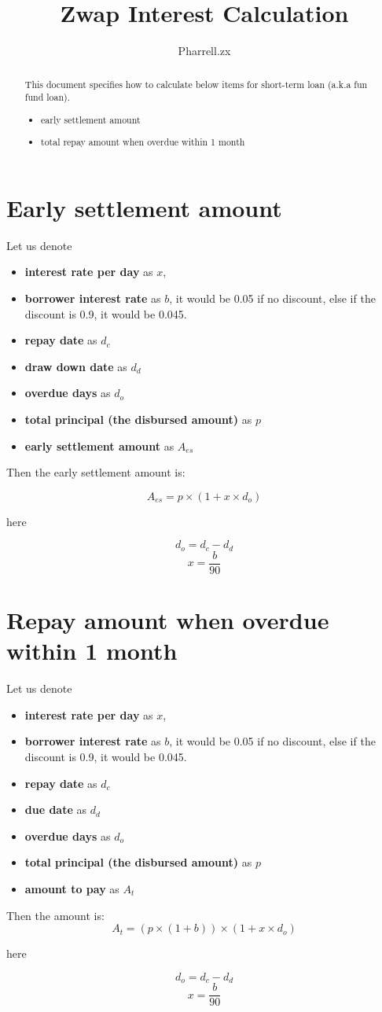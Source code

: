\documentclass[a4paper]{article}
\title{Zwap Interest Calculation}
\author{Pharrell.zx}
\begin{document}
\maketitle

\begin{abstract}
This document specifies how to calculate below items for short-term loan (a.k.a fun fund loan).
\begin{itemize}
      \item early settlement amount
      \item total repay amount when overdue within 1 month
\end{itemize}
\end{abstract}

\section{Early settlement amount}
Let us denote
\begin{itemize}
      \item \textbf{interest rate per day} as \(x\),
      \item \textbf{borrower interest rate} as \(b\), it would be 0.05 if no discount, else if the discount is 0.9, it would be 0.045.
      \item \textbf{repay date} as \(d_c\)
      \item \textbf{draw down date} as \(d_d\)
      \item \textbf{overdue days} as \(d_o\)
      \item \textbf{total principal (the disbursed amount)} as \(p\)
      \item \textbf{early settlement amount} as \(A_{es}\)
\end{itemize}

Then the early settlement amount is: 

\[A_{es} = p\times(1+x\times d_o)\]

here

\[d_o = d_c - d_d\]
\[x =\frac{b}{90}\]

\section{Repay amount when overdue within 1 month}

Let us denote
\begin{itemize}
      \item \textbf{interest rate per day} as \(x\),
      \item \textbf{borrower interest rate} as \(b\), it would be 0.05 if no discount, else if the discount is 0.9, it would be 0.045.
      \item \textbf{repay date} as \(d_c\)
      \item \textbf{due date} as \(d_d\)
      \item \textbf{overdue days} as \(d_o\)
      \item \textbf{total principal (the disbursed amount)} as \(p\)
      \item \textbf{amount to pay} as \(A_{t}\)
\end{itemize}

Then the amount is: 
\[A_{t} = (p\times(1+b))\times(1+x\times d_o)\]

here

\[d_o = d_c - d_d\]
\[x =\frac{b}{90}\]

% 
% 
\end{document}
